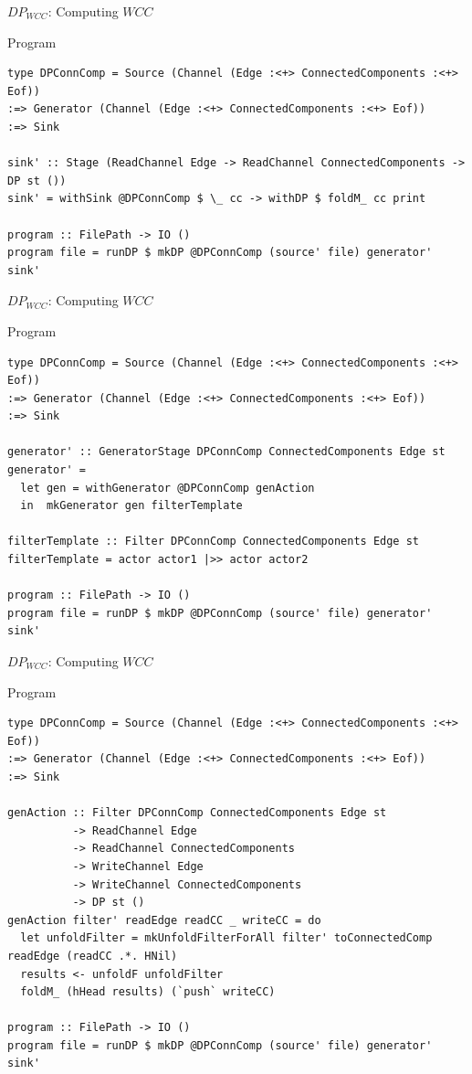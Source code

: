 \documentclass{beamer}
\begin{document}
  \begin{frame}[fragile]{$DP_{WCC}$: Computing $WCC$}
    \begin{block}{Program}
      \begin{verbatim}      
type DPConnComp = Source (Channel (Edge :<+> ConnectedComponents :<+> Eof))
:=> Generator (Channel (Edge :<+> ConnectedComponents :<+> Eof))
:=> Sink

sink' :: Stage (ReadChannel Edge -> ReadChannel ConnectedComponents -> DP st ())
sink' = withSink @DPConnComp $ \_ cc -> withDP $ foldM_ cc print

program :: FilePath -> IO ()
program file = runDP $ mkDP @DPConnComp (source' file) generator' sink'  
      \end{verbatim}
    \end{block}
  \end{frame}

  \begin{frame}[fragile]{$DP_{WCC}$: Computing $WCC$}
    \begin{block}{Program}
      \begin{verbatim}      
type DPConnComp = Source (Channel (Edge :<+> ConnectedComponents :<+> Eof))
:=> Generator (Channel (Edge :<+> ConnectedComponents :<+> Eof))
:=> Sink

generator' :: GeneratorStage DPConnComp ConnectedComponents Edge st
generator' =
  let gen = withGenerator @DPConnComp genAction
  in  mkGenerator gen filterTemplate

filterTemplate :: Filter DPConnComp ConnectedComponents Edge st
filterTemplate = actor actor1 |>> actor actor2

program :: FilePath -> IO ()
program file = runDP $ mkDP @DPConnComp (source' file) generator' sink'
      \end{verbatim}
    \end{block}
  \end{frame}

  \begin{frame}[fragile]{$DP_{WCC}$: Computing $WCC$}
    \begin{block}{Program}
      \begin{verbatim}      
type DPConnComp = Source (Channel (Edge :<+> ConnectedComponents :<+> Eof))
:=> Generator (Channel (Edge :<+> ConnectedComponents :<+> Eof))
:=> Sink

genAction :: Filter DPConnComp ConnectedComponents Edge st
          -> ReadChannel Edge
          -> ReadChannel ConnectedComponents
          -> WriteChannel Edge
          -> WriteChannel ConnectedComponents
          -> DP st ()
genAction filter' readEdge readCC _ writeCC = do
  let unfoldFilter = mkUnfoldFilterForAll filter' toConnectedComp readEdge (readCC .*. HNil) 
  results <- unfoldF unfoldFilter
  foldM_ (hHead results) (`push` writeCC)

program :: FilePath -> IO ()
program file = runDP $ mkDP @DPConnComp (source' file) generator' sink'
      \end{verbatim}
    \end{block}
  \end{frame}
\end{document}
